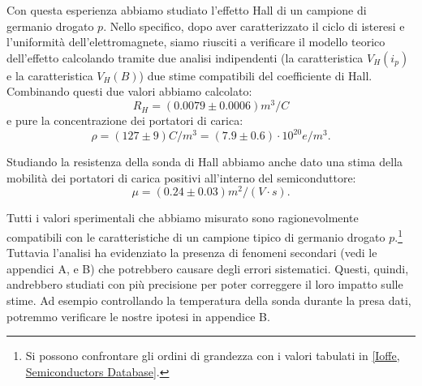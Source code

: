 
Con questa esperienza abbiamo studiato l'effetto Hall di un campione di germanio drogato $ p $.
Nello specifico, dopo aver caratterizzato il ciclo di isteresi e l'uniformità dell'elettromagnete, siamo riusciti a verificare il modello teorico dell'effetto calcolando tramite due analisi indipendenti (la caratteristica $ V_H(i_p) $ e la caratteristica $ V_H(B) $) due stime compatibili del coefficiente di Hall.
Combinando questi due valori abbiamo calcolato:
\begin{equation}
R_H = (0.0079 \pm 0.0006) \unit{m^3 / C}
\end{equation}
e pure la concentrazione dei portatori di carica:
\begin{equation}
\rho = (127 \pm 9) \unit{C / m^3} = (7.9 \pm 0.6) \cdot 10^{20} \unit{e/m^3}.
\end{equation}

Studiando la resistenza della sonda di Hall abbiamo anche dato una stima della mobilità dei portatori di carica positivi all'interno del semiconduttore:
\begin{equation}
\mu = (0.24 \pm 0.03) \unit{m^2 / (V \cdot s)}.
\end{equation}

Tutti i valori sperimentali che abbiamo misurato sono ragionevolmente compatibili con le caratteristiche di un campione tipico di germanio drogato $ p $.\footnote{Si possono confrontare gli ordini di grandezza con i valori tabulati in \href{https://www.ioffe.ru/SVA/NSM/Semicond/Ge/electric.html}{[Ioffe, Semiconductors Database]}.}
Tuttavia l'analisi ha evidenziato la presenza di fenomeni secondari (vedi le appendici A, e B) che potrebbero causare degli errori sistematici.
Questi, quindi, andrebbero studiati con più precisione per poter correggere il loro impatto sulle stime.
Ad esempio controllando la temperatura della sonda durante la presa dati, potremmo verificare le nostre ipotesi in appendice B.
